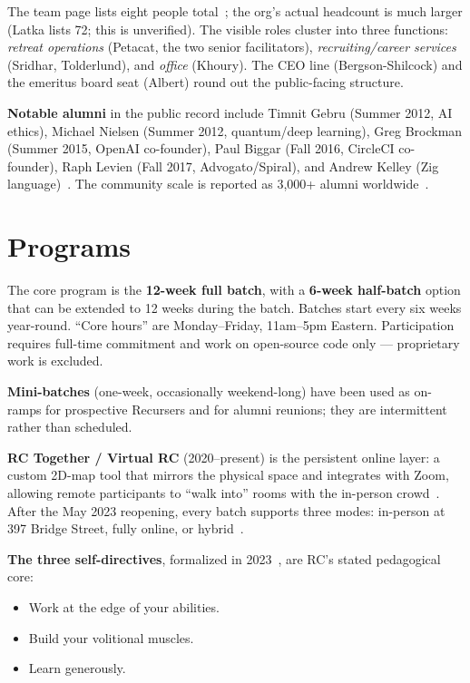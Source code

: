 \documentclass[10pt,letterpaper,twocolumn]{article}
\begin{document}
The team page lists eight people total~\citep{rcteam}; the org's actual headcount is much larger (Latka lists 72; this is unverified). The visible roles cluster into three functions: \textit{retreat operations} (Petacat, the two senior facilitators), \textit{recruiting/career services} (Sridhar, Tolderlund), and \textit{office} (Khoury). The CEO line (Bergson-Shilcock) and the emeritus board seat (Albert) round out the public-facing structure.

\textbf{Notable alumni} in the public record include Timnit Gebru (Summer 2012, AI ethics), Michael Nielsen (Summer 2012, quantum/deep learning), Greg Brockman (Summer 2015, OpenAI co-founder), Paul Biggar (Fall 2016, CircleCI co-founder), Raph Levien (Fall 2017, Advogato/Spiral), and Andrew Kelley (Zig language)~\citep{wikipediarc}. The community scale is reported as 3,000+ alumni worldwide~\citep{rcabout}.

\section{Programs}

The core program is the \textbf{12-week full batch}, with a \textbf{6-week half-batch} option that can be extended to 12 weeks during the batch. Batches start every six weeks year-round. ``Core hours'' are Monday--Friday, 11am--5pm Eastern. Participation requires full-time commitment and work on open-source code only --- proprietary work is excluded.~\citep{rcmanual}

\textbf{Mini-batches} (one-week, occasionally weekend-long) have been used as on-ramps for prospective Recursers and for alumni reunions; they are intermittent rather than scheduled.

\textbf{RC Together / Virtual RC} (2020--present) is the persistent online layer: a custom 2D-map tool that mirrors the physical space and integrates with Zoom, allowing remote participants to ``walk into'' rooms with the in-person crowd~\citep{rcvirtualpage}. After the May 2023 reopening, every batch supports three modes: in-person at 397 Bridge Street, fully online, or hybrid~\citep{rcnewretreat}.

\textbf{The three self-directives}, formalized in 2023~\citep{rcselfdirectives}, are RC's stated pedagogical core:
\begin{itemize}
\item Work at the edge of your abilities.
\item Build your volitional muscles.
\item Learn generously.
\end{itemize}
\end{document}
